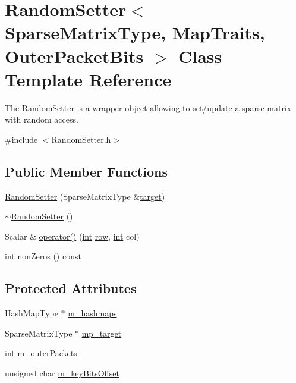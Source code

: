\hypertarget{class_random_setter}{\section{Random\-Setter$<$ Sparse\-Matrix\-Type, Map\-Traits, Outer\-Packet\-Bits $>$ Class Template Reference}
\label{class_random_setter}
}


The \hyperlink{class_random_setter}{Random\-Setter} is a wrapper object allowing to set/update a sparse matrix with random access.  




{\ttfamily \#include $<$Random\-Setter.\-h$>$}

\subsection*{Public Member Functions}
\begin{DoxyCompactItemize}
\item 
\hyperlink{class_random_setter_aa2d1d21660876a427be187798adf9a70}{Random\-Setter} (Sparse\-Matrix\-Type \&\hyperlink{glext_8h_af9d0cbbbeb7414e786c41899e5a856d7}{target})
\item 
\hyperlink{class_random_setter_aba28f5b1e47a0abe673af98606d5a0ba}{$\sim$\-Random\-Setter} ()
\item 
Scalar \& \hyperlink{class_random_setter_a7dcdef8b92e05e465cdbcf248ad58122}{operator()} (\hyperlink{ioapi_8h_a787fa3cf048117ba7123753c1e74fcd6}{int} \hyperlink{glext_8h_a11b277b422822f784ee248b43eee3e1e}{row}, \hyperlink{ioapi_8h_a787fa3cf048117ba7123753c1e74fcd6}{int} col)
\item 
\hyperlink{ioapi_8h_a787fa3cf048117ba7123753c1e74fcd6}{int} \hyperlink{class_random_setter_a7bdcf2cd511fb51539656c205cf4af7b}{non\-Zeros} () const 
\end{DoxyCompactItemize}
\subsection*{Protected Attributes}
\begin{DoxyCompactItemize}
\item 
Hash\-Map\-Type $\ast$ \hyperlink{class_random_setter_a887d530ce0b1137e1fa2938e387a0174}{m\-\_\-hashmaps}
\item 
Sparse\-Matrix\-Type $\ast$ \hyperlink{class_random_setter_afa6596e02bd8d3d1b84096a73a3b14a7}{mp\-\_\-target}
\item 
\hyperlink{ioapi_8h_a787fa3cf048117ba7123753c1e74fcd6}{int} \hyperlink{class_random_setter_a0b8234ec69d32ecfd49199e27e8b3646}{m\-\_\-outer\-Packets}
\item 
unsigned char \hyperlink{class_random_setter_a3f86ea0a3ce0e7237cee807e2d1b6809}{m\-\_\-key\-Bits\-Offset}
\end{DoxyCompactItemize}


